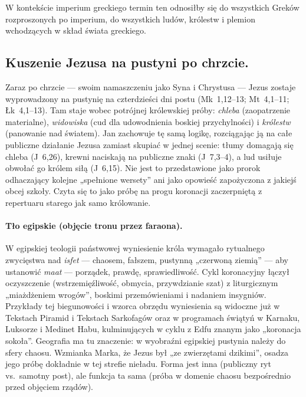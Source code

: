 W kontekście imperium greckiego termin ten odnosiłby się do wszystkich Greków rozproszonych po imperium, do wszystkich ludów, królestw i plemion wchodzących w skład świata greckiego.

\subsection{Kuszenie Jezusa na pustyni po chrzcie.}\label{subsec:the-temptation-of-jesus-in-the-wilderness-following-the-baptism.}

Zaraz po chrzcie — swoim namaszczeniu jako Syna i Chrystusa — Jezus zostaje wyprowadzony na pustynię na czterdzieści dni postu (Mk~1,12--13; Mt~4,1--11; Łk~4,1--13).
Tam staje wobec potrójnej królewskiej próby: \emph{chleba} (zaopatrzenie materialne), \emph{widowiska} (cud dla udowodnienia boskiej przychylności) i \emph{królestw} (panowanie nad światem).
Jan zachowuje tę samą logikę, rozciągając ją na całe publiczne działanie Jezusa zamiast skupiać w jednej scenie: tłumy domagają się chleba (J~6,26), krewni naciskają na publiczne znaki (J~7,3--4), a lud usiłuje obwołać go królem siłą (J~6,15).
Nie jest to przedstawione jako prorok odhaczający kolejne „spełnione wersety” ani jako opowieść zapożyczona z jakiejś obcej szkoły.
Czyta się to jako próbę na progu koronacji zaczerpniętą z repertuaru starego jak samo królowanie.

\paragraph*{Tło egipskie (objęcie tronu przez faraona).}
W egipskiej teologii państwowej wyniesienie króla wymagało rytualnego zwycięstwa nad \emph{isfet} — chaosem, fałszem, pustynną „czerwoną ziemią” — aby ustanowić \emph{maat} — porządek, prawdę, sprawiedliwość.
Cykl koronacyjny łączył oczyszczenie (wstrzemięźliwość, obmycia, przywdzianie szat) z liturgicznym „miażdżeniem wrogów”, boskimi przemówieniami i nadaniem insygniów.
Przykłady tej biegunowości i wzorca obrzędu wyniesienia są widoczne już w Tekstach Piramid i Tekstach Sarkofagów oraz w programach świątyń w Karnaku, Luksorze i Medinet Habu, kulminujących w cyklu z Edfu znanym jako „koronacja sokoła”.
Geografia ma tu znaczenie: w wyobraźni egipskiej pustynia należy do sfery chaosu.
Wzmianka Marka, że Jezus był „ze zwierzętami dzikimi”, osadza jego próbę dokładnie w tej strefie nieładu.
Forma jest inna (publiczny ryt vs.\ samotny post), ale funkcja ta sama (próba w domenie chaosu bezpośrednio przed objęciem rządów).

